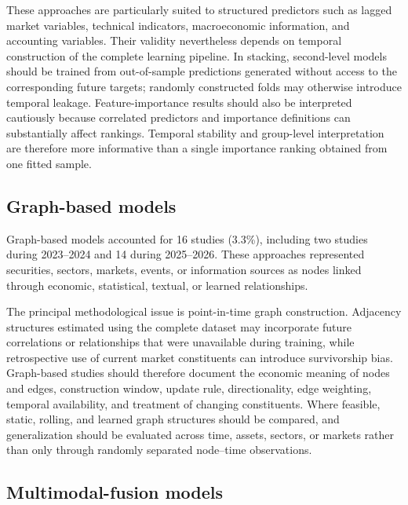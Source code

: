\documentclass[12pt]{article}
\numberwithin{equation}{section}
\begin{document}
These approaches are particularly suited to structured predictors such as
lagged market variables, technical indicators, macroeconomic information,
and accounting variables. Their validity nevertheless depends on temporal
construction of the complete learning pipeline. In stacking, second-level
models should be trained from out-of-sample predictions generated without
access to the corresponding future targets; randomly constructed folds may
otherwise introduce temporal leakage. Feature-importance \cite{P00749,P00751,P00759,P00767,P00769,P00773,P00796,P00824,P00825,P00833,P00853,P00863,P01582,P01663,P01837,P01978,P02751,P03242,P03277,P03347,P03446,P03540,P03726,P03799} results should also
be interpreted cautiously because correlated predictors and importance
definitions can substantially affect rankings. Temporal stability and
group-level interpretation are therefore more informative than a single
importance ranking obtained from one fitted sample.

\subsection{Graph-based models}
\label{sec:supp-graph}

Graph-based models accounted for 16 studies (3.3\%), including two studies
during 2023--2024 and 14 during 2025--2026. These approaches represented
securities, sectors, markets, events, or information sources as nodes linked
through economic, statistical, textual, or learned relationships.

The principal methodological issue is point-in-time graph construction.
Adjacency structures estimated using the complete dataset may incorporate
future correlations or relationships that were unavailable during training,
while retrospective use of current market constituents can introduce
survivorship bias. Graph-based studies \cite{P00050,P00151,P00186,P00248,P00293,P00297,P00414,P00513,P00674,P00727,P00753,P00816,P00879,P01043,P01281,P01732} should therefore document the economic
meaning of nodes and edges, construction window, update rule, directionality,
edge weighting, temporal availability, and treatment of changing
constituents. Where feasible, static, rolling, and learned graph structures
should be compared, and generalization should be evaluated across time,
assets, sectors, or markets rather than only through randomly separated
node--time observations.


\subsection{Multimodal-fusion models}
\label{sec:supp-multimodal}
\end{document}
